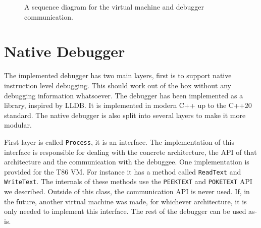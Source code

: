 \begin{figure}
    \centering
    \scalebox{0.8} {
    }
    \caption{A sequence diagram for the virtual machine and debugger communication.}
    \label{fig:dbg-vm-seq}
\end{figure}

\section{Native Debugger}
The implemented debugger has two main layers, first is to support native
instruction level debugging. This should work out of the box without any
debugging information whatsoever. The debugger has been implemented as a
library, inspired by LLDB. It is implemented in modern C++ up to the C++20
standard. The native debugger is also split into several layers to make it more
modular.

First layer is called \texttt{Process}, it is an interface. The implementation
of this interface is responsible for dealing with the concrete architecture,
the API of that architecture and the communication with the debuggee. One
implementation is provided for the T86 VM. For instance it has a method called
\texttt{ReadText} and \texttt{WriteText}. The internals of these methods use
the \texttt{PEEKTEXT} and \texttt{POKETEXT} API we described. Outside of this
class, the communication API is never used. If, in the future, another virtual
machine was made, for whichever architecture, it is only needed to implement
this interface. The rest of the debugger can be used as-is.

